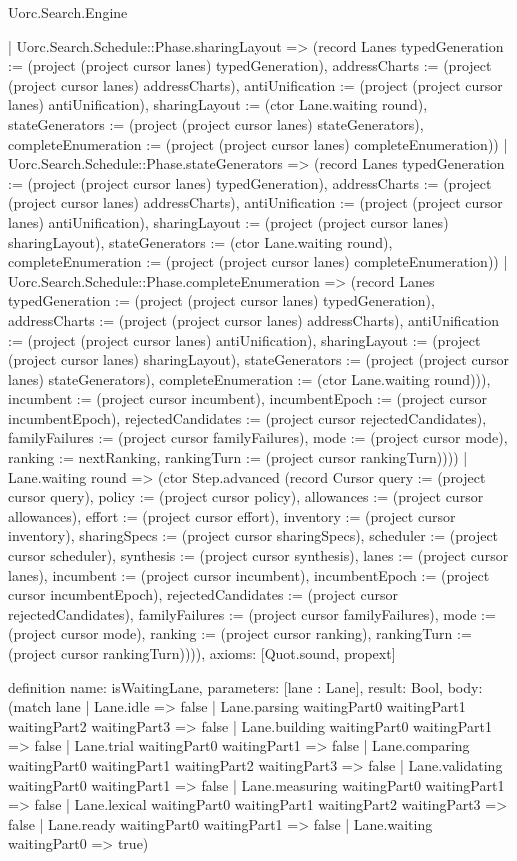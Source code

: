 \begin{lexlean}{Uorc.Search.Engine}
\begin{semanticmodule}
{{        | Uorc.Search.Schedule::Phase.sharingLayout => (record Lanes {typedGeneration := (project (project cursor lanes) typedGeneration), addressCharts := (project (project cursor lanes) addressCharts), antiUnification := (project (project cursor lanes) antiUnification), sharingLayout := (ctor Lane.waiting round), stateGenerators := (project (project cursor lanes) stateGenerators), completeEnumeration := (project (project cursor lanes) completeEnumeration)})
        | Uorc.Search.Schedule::Phase.stateGenerators => (record Lanes {typedGeneration := (project (project cursor lanes) typedGeneration), addressCharts := (project (project cursor lanes) addressCharts), antiUnification := (project (project cursor lanes) antiUnification), sharingLayout := (project (project cursor lanes) sharingLayout), stateGenerators := (ctor Lane.waiting round), completeEnumeration := (project (project cursor lanes) completeEnumeration)})
        | Uorc.Search.Schedule::Phase.completeEnumeration => (record Lanes {typedGeneration := (project (project cursor lanes) typedGeneration), addressCharts := (project (project cursor lanes) addressCharts), antiUnification := (project (project cursor lanes) antiUnification), sharingLayout := (project (project cursor lanes) sharingLayout), stateGenerators := (project (project cursor lanes) stateGenerators), completeEnumeration := (ctor Lane.waiting round)})), incumbent := (project cursor incumbent), incumbentEpoch := (project cursor incumbentEpoch), rejectedCandidates := (project cursor rejectedCandidates), familyFailures := (project cursor familyFailures), mode := (project cursor mode), ranking := nextRanking, rankingTurn := (project cursor rankingTurn)})))
    | Lane.waiting round => (ctor Step.advanced (record Cursor {query := (project cursor query), policy := (project cursor policy), allowances := (project cursor allowances), effort := (project cursor effort), inventory := (project cursor inventory), sharingSpecs := (project cursor sharingSpecs), scheduler := (project cursor scheduler), synthesis := (project cursor synthesis), lanes := (project cursor lanes), incumbent := (project cursor incumbent), incumbentEpoch := (project cursor incumbentEpoch), rejectedCandidates := (project cursor rejectedCandidates), familyFailures := (project cursor familyFailures), mode := (project cursor mode), ranking := (project cursor ranking), rankingTurn := (project cursor rankingTurn)}))),
  axioms: [Quot.sound, propext]
}

definition{
  name: isWaitingLane,
  parameters: [lane : Lane],
  result: Bool,
  body: (match lane
    | Lane.idle => false
    | Lane.parsing waitingPart0 waitingPart1 waitingPart2 waitingPart3 => false
    | Lane.building waitingPart0 waitingPart1 => false
    | Lane.trial waitingPart0 waitingPart1 => false
    | Lane.comparing waitingPart0 waitingPart1 waitingPart2 waitingPart3 => false
    | Lane.validating waitingPart0 waitingPart1 => false
    | Lane.measuring waitingPart0 waitingPart1 => false
    | Lane.lexical waitingPart0 waitingPart1 waitingPart2 waitingPart3 => false
    | Lane.ready waitingPart0 waitingPart1 => false
    | Lane.waiting waitingPart0 => true)
}


\end{semanticmodule}
\end{lexlean}
